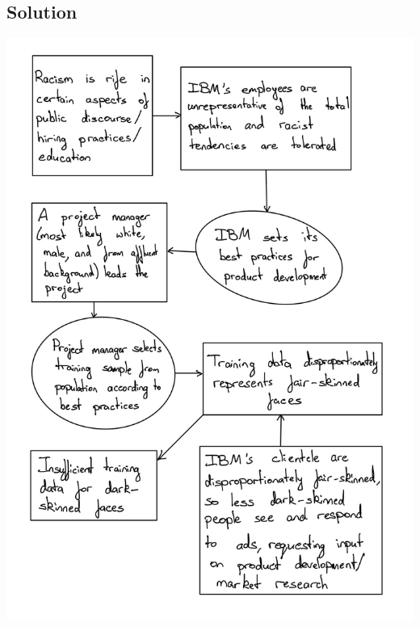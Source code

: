 \documentclass[submit]{harvardml}
\begin{document}
\subsection*{Solution}
\begin{center}
    \includegraphics[scale=0.3]{HW4/3.png}
\end{center}
\end{document}
